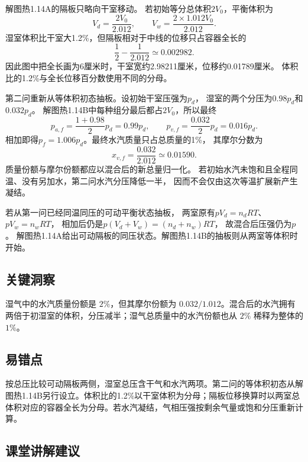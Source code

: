 \documentclass[UTF8,fontset=fandol,a4paper,11pt]{ctexart}
\begin{document}
解图热1.14A的隔板只略向干室移动。
若初始等分总体积$2V_0$，平衡体积为
\[
V_d=\frac{2V_0}{2.012},\qquad
V_w=\frac{2\times1.012V_0}{2.012}.
\]
湿室体积比干室大1.2\%，但隔板相对于中线的位移只占容器全长的
\[
\frac12-\frac1{2.012}\simeq0.002982.
\]
因此图中把全长画为6厘米时，干室宽约2.98211厘米，位移约0.01789厘米。
体积比的1.2\%与全长位移百分数使用不同的分母。

第二问重新从等体积初态抽板。设初始干室压强为$p_d$，
湿室的两个分压为$0.98p_d$和$0.032p_d$。
解图热1.14B中每种组分最后都占$2V_0$，所以最终
\[
p_{a,f}=\frac{1+0.98}{2}p_d=0.99p_d,\qquad
p_{v,f}=\frac{0.032}{2}p_d=0.016p_d.
\]
相加即得$p_f=1.006p_d$。最终水汽质量只占总质量的1\%，
其摩尔分数为
\[
x_{v,f}=\frac{0.032}{2.012}\simeq0.01590.
\]
质量份额与摩尔份额都应以混合后的新总量归一化。
若初始水汽未饱和且全程同温、没有另加水，第二问水汽分压降低一半，
因而不会仅由这次等温扩展新产生凝结。

若从第一问已经同温同压的可动平衡状态抽板，
两室原有$pV_d=n_dRT$、$pV_w=n_wRT$，
相加后仍是$p(V_d+V_w)=(n_d+n_w)RT$，
故混合后压强仍为$p$。
解图热1.14A给出可动隔板的同压状态。解图热1.14B的抽板则从两室等体积时开始。




\subsection*{关键洞察}

湿气中的水汽质量份额是 $2\%$，但其摩尔份额为 $0.032/1.012$。混合后的水汽拥有两倍于初湿室的体积，分压减半；湿气总质量中的水汽份额也从 $2\%$ 稀释为整体的 $1\%$。



\subsection*{易错点}

按总压比较可动隔板两侧，湿室总压含干气和水汽两项。第二问的等体积初态从解图热1.14B另行设立。体积比的1.2\%以干室体积为分母；隔板位移换算时以两室总体积对应的容器全长为分母。若水汽凝结，气相压强按剩余气量或饱和分压重新计算。



\subsection*{课堂讲解建议}
\end{document}

